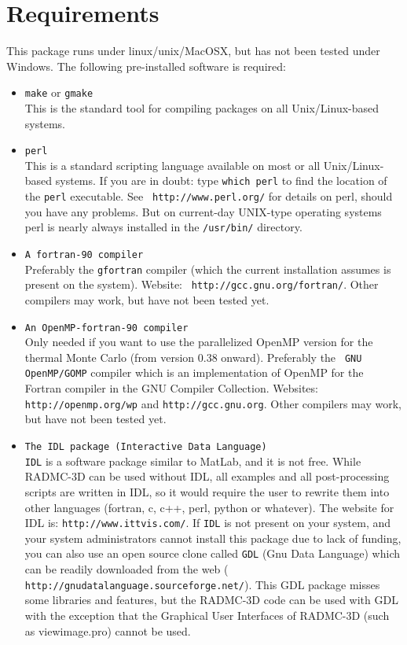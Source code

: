 \documentclass{report}
\begin{document}
\section{Requirements}\label{sec-requirements}
This package runs under linux/unix/MacOSX, but has not been tested under
Windows. The following pre-installed software is required:
\begin{itemize}
\item {\small\tt make} or {\small\tt gmake}\\
  This is the standard tool for compiling packages on all Unix/Linux-based
  systems.
\item {\small\tt perl}\\
  This is a standard scripting language available on most or all
  Unix/Linux-based systems. If you are in doubt: type {\small\tt which perl}
  to find the location of the {\small\tt perl} executable. See {\small\tt
    http://www.perl.org/} for details on perl, should you have any
  problems. But on current-day UNIX-type operating systems perl is nearly
  always installed in the {\small\tt /usr/bin/} directory.
\item {\small\tt A fortran-90 compiler}\\
  Preferably the {\small\tt gfortran} compiler (which the current
  installation assumes is present on the system). Website: {\small\tt
    http://gcc.gnu.org/fortran/}. Other compilers may work, but have not
  been tested yet.
\item {\small\tt An OpenMP-fortran-90 compiler}\\
  Only needed if you want to use the parallelized OpenMP version for the
  thermal Monte Carlo (from version 0.38 onward). Preferably the {\small\tt
    GNU OpenMP/GOMP} compiler which is an implementation of OpenMP for the
  Fortran compiler in the GNU Compiler Collection. Websites: {\small\tt
    http://openmp.org/wp} and {\small\tt http://gcc.gnu.org}. Other
  compilers may work, but have not been tested yet.
\item {\small\tt The IDL package (Interactive Data Language)}\\
  {\small\tt IDL} is a software package similar to MatLab, and it is not
  free.  While RADMC-3D can be used without IDL, all examples and all
  post-processing scripts are written in IDL, so it would require the user
  to rewrite them into other languages (fortran, c, c++, perl, python or
  whatever). The website for IDL is: {\small\tt http://www.ittvis.com/}. If
  {\small\tt IDL} is not present on your system, and your system
  administrators cannot install this package due to lack of funding, you can
  also use an open source clone called {\small\tt GDL} (Gnu Data Language)
  which can be readily downloaded from the web ({\small\tt
    http://gnudatalanguage.sourceforge.net/}). This GDL package misses some
  libraries and features, but the RADMC-3D code can be used with GDL with
  the exception that the Graphical User Interfaces of RADMC-3D (such as
  viewimage.pro) cannot be used.
\end{itemize}
\end{document}
